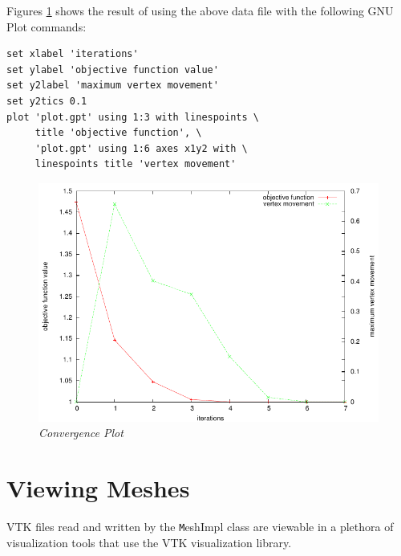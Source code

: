 Figures \ref{fig:iterplot} shows the result of using the above data file with the following GNU Plot commands:
\begin{verbatim}
set xlabel 'iterations'
set ylabel 'objective function value'
set y2label 'maximum vertex movement'
set y2tics 0.1
plot 'plot.gpt' using 1:3 with linespoints \
     title 'objective function', \
     'plot.gpt' using 1:6 axes x1y2 with \
     linespoints title 'vertex movement'
\end{verbatim}

\begin{figure}[htb!]
\begin{center}
\includegraphics[width=5in]{figures/iterplot}
\caption{\em Convergence Plot \label{fig:iterplot}}
\end{center}
\end{figure}

\section{Viewing Meshes}

VTK files read and written by the {\texttt MeshImpl} class are viewable in a plethora of visualization tools that use the VTK visualization library.

